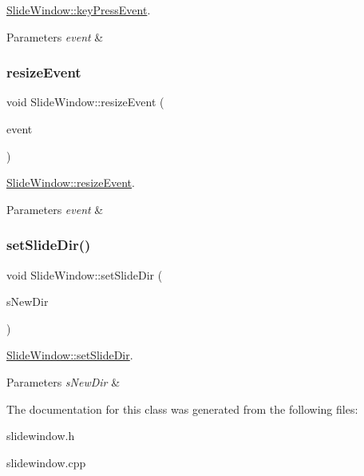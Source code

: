 \mbox{\hyperlink{classSlideWindow_a0527c72528a39dfbe2a0efc611242464}{Slide\+Window\+::key\+Press\+Event}}. 


\begin{DoxyParams}{Parameters}
{\em event} & \\
\hline
\end{DoxyParams}
\mbox{\label{classSlideWindow_ab5c3808fd4f64a3763245be30cfde5f2}} 
\subsubsection{\texorpdfstring{resize\+Event}{resizeEvent}}
{\footnotesize\ttfamily void Slide\+Window\+::resize\+Event (\begin{DoxyParamCaption}\item[{Q\+Resize\+Event $\ast$}]{event }\end{DoxyParamCaption})\hspace{0.3cm}{\ttfamily [slot]}}



\mbox{\hyperlink{classSlideWindow_ab5c3808fd4f64a3763245be30cfde5f2}{Slide\+Window\+::resize\+Event}}. 


\begin{DoxyParams}{Parameters}
{\em event} & \\
\hline
\end{DoxyParams}
\mbox{\label{classSlideWindow_aff6b7e8c3b00f1a17bea3f2dd60a8ad1}} 
\subsubsection{\texorpdfstring{set\+Slide\+Dir()}{setSlideDir()}}
{\footnotesize\ttfamily void Slide\+Window\+::set\+Slide\+Dir (\begin{DoxyParamCaption}\item[{Q\+String}]{s\+New\+Dir }\end{DoxyParamCaption})}



\mbox{\hyperlink{classSlideWindow_aff6b7e8c3b00f1a17bea3f2dd60a8ad1}{Slide\+Window\+::set\+Slide\+Dir}}. 


\begin{DoxyParams}{Parameters}
{\em s\+New\+Dir} & \\
\hline
\end{DoxyParams}


The documentation for this class was generated from the following files\+:\begin{DoxyCompactItemize}
\item 
slidewindow.\+h\item 
slidewindow.\+cpp\end{DoxyCompactItemize}
